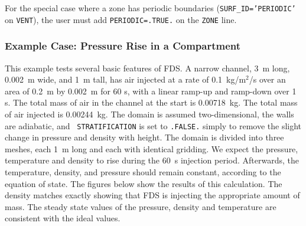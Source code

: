 \documentclass[11pt]{book}
\newcommand{\ct}{\tt\small}
\begin{document}
For the special case where a zone has periodic boundaries ({\ct SURF\_ID='PERIODIC'} on {\ct VENT}), the user must add {\ct PERIODIC=.TRUE.} on the {\ct ZONE} line.


\subsubsection{Example Case: Pressure Rise in a Compartment}

This example tests several basic features of FDS. A narrow channel, 3~m long, 0.002~m wide, and 1~m tall, has air injected at a rate of
0.1~kg/m$^2$/s over an area of 0.2~m by 0.002~m for 60 s, with a linear ramp-up and ramp-down over 1 s. The total mass of air in the channel at the
start is 0.00718~kg. The total mass of air injected is 0.00244~kg. The domain is assumed two-dimensional, the walls are adiabatic, and {\ct
STRATIFICATION} is set to {\ct .FALSE.} simply to remove the slight change in pressure and density with height.
The domain is divided into three meshes, each 1~m long and each with identical gridding.  We expect the pressure,
temperature and density to rise during the 60~s injection period. Afterwards, the
temperature, density, and pressure should remain constant, according to the equation of state.
The figures below show the results of this calculation.  The density matches exactly showing
that FDS is injecting the appropriate amount of mass. The steady state values of the pressure, density and temperature are consistent with
the ideal values.
\end{document}
